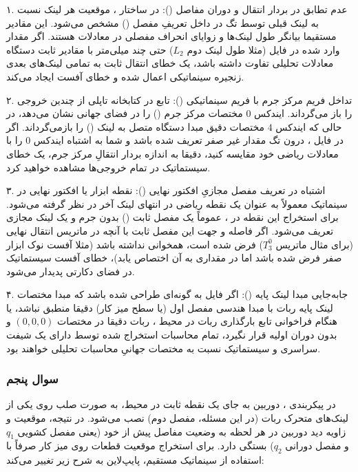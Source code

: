 \documentclass{article}
\begin{document}
۱. عدم تطابق در بردار انتقال و دوران مفاصل ():
در ساختار ، موقعیت هر لینک نسبت به لینک قبلی توسط تگ  در داخل تعریفِ مفصل () مشخص می‌شود. این مقادیر مستقیما بیانگر طول لینک‌ها و زوایای انحراف مفصلی در معادلات  هستند. اگر مقدار وارد شده در فایل  (مثلا طول لینک دوم $ L_2 $) حتی چند میلی‌متر با مقادیر ثابت دستگاه معادلات تحلیلی تفاوت داشته باشد، یک خطای انتقال ثابت به تمامی لینک‌های بعدی زنجیره سینماتیکی اعمال شده و خطای آفست ایجاد می‌کند.

۲. تداخل فریم مرکز جرم با فریم سینماتیکی ():
تابع  در کتابخانه  تاپلی از چندین خروجی را باز می‌گرداند. ایندکس $ 0 $ مختصات مرکز جرم () را در فضای جهانی نشان می‌دهد، در حالی که ایندکس $ 4 $ مختصات دقیق مبدا دستگاه متصل به لینک () را بازمی‌گرداند. اگر در فایل ، درون تگ  مقدار  غیر صفر تعریف شده باشد و شما به اشتباه ایندکس $ 0 $ را با معادلات ریاضی خود مقایسه کنید، دقیقا به اندازه بردار انتقالِ مرکز جرم، یک خطای سیستماتیک در تمام خروجی‌ها مشاهده خواهید کرد.

۳. اشتباه در تعریف مفصل مجازیِ افکتور نهایی ():
نقطه ابزار یا افکتور نهایی در سینماتیک معمولاً به عنوان یک نقطه ریاضی در انتهای لینک آخر در نظر گرفته می‌شود. برای استخراج این نقطه در ، عموماً یک مفصل ثابت () بدون جرم و یک لینک مجازی تعریف می‌شود. اگر فاصله و جهت این مفصل ثابت با آنچه در ماتریس انتقال نهایی (برای مثال ماتریس $ T_3^0 $) فرض شده است، همخوانی نداشته باشد (مثلا آفست نوک ابزار صفر فرض شده باشد اما در  مقداری به آن اختصاص یابد)، خطای آفست سیستماتیک در فضای دکارتی پدیدار می‌شود.

۴. جابه‌جایی مبدا لینک پایه ():
اگر فایل  به گونه‌ای طراحی شده باشد که مبدا مختصات لینک پایه ربات با مبدا هندسی مفصل اول (یا سطح میز کار) دقیقا منطبق نباشد، یا هنگام فراخوانی تابع بارگذاری ربات در محیط ، ربات دقیقا در مختصات $ (0, 0, 0) $ و بدون دوران اولیه قرار نگیرد، تمام محاسبات استخراج شده توسط  دارای یک شیفت سراسری و سیستماتیک نسبت به مختصات جهانیِ محاسبات تحلیلی خواهند بود.

\subsubsection{سوال پنجم}
در پیکربندی ، دوربین به جای یک نقطه ثابت در محیط، به صورت صلب روی یکی از لینک‌های متحرک ربات (در این مسئله، مفصل دوم) نصب می‌شود. در نتیجه، موقعیت و زاویه دید دوربین در هر لحظه به وضعیت مفاصل پیش از خود (یعنی مفصل کشویی $ q_1 $ و مفصل دورانی $ q_2 $) بستگی دارد. برای استخراج موقعیت قطعات روی میز کار صرفاً با استفاده از سینماتیک مستقیم، پایپ‌لاین به شرح زیر تغییر می‌کند:
\end{document}
